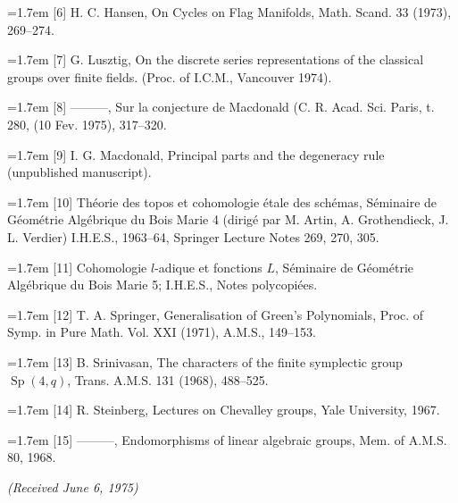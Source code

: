 \documentclass[9pt,twoside]{extarticle}
\begin{document}
{\noindent\hangindent=1.7em [6] H. C. Hansen, On Cycles on Flag Manifolds, Math. Scand. 33 (1973), 269--274.\par

\noindent\hangindent=1.7em [7] G. Lusztig, On the discrete series representations of the classical groups over finite fields. (Proc. of I.C.M., Vancouver 1974).\par

\noindent\hangindent=1.7em [8] ---------, Sur la conjecture de Macdonald (C. R. Acad. Sci. Paris, t. 280, (10 Fev. 1975), 317--320.\par

\noindent\hangindent=1.7em [9] I. G. Macdonald, Principal parts and the degeneracy rule (unpublished manuscript).\par

\noindent\hangindent=1.7em [10] Théorie des topos et cohomologie étale des schémas, Séminaire de Géométrie Algébrique du Bois Marie 4 (dirigé par M. Artin, A. Grothendieck, J. L. Verdier) I.H.E.S., 1963--64, Springer Lecture Notes 269, 270, 305.\par

\noindent\hangindent=1.7em [11] Cohomologie \(l\)-adique et fonctions \(L\), Séminaire de Géométrie Algébrique du Bois Marie 5; I.H.E.S., Notes polycopiées.\par

\noindent\hangindent=1.7em [12] T. A. Springer, Generalisation of Green's Polynomials, Proc. of Symp. in Pure Math. Vol. XXI (1971), A.M.S., 149--153.\par

\noindent\hangindent=1.7em [13] B. Srinivasan, The characters of the finite symplectic group \(\operatorname{Sp}(4,q)\), Trans. A.M.S. 131 (1968), 488--525.\par

\noindent\hangindent=1.7em [14] R. Steinberg, Lectures on Chevalley groups, Yale University, 1967.\par

\noindent\hangindent=1.7em [15] ---------, Endomorphisms of linear algebraic groups, Mem. of A.M.S. 80, 1968.\par

\medskip\noindent\itshape (Received June 6, 1975)\par\normalfont
}
\end{document}
